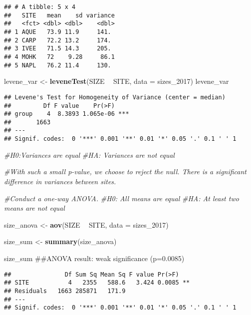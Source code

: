 \documentclass[]{article}
\newenvironment{Shaded}{\begin{snugshade}}{\end{snugshade}}
\newcommand{\KeywordTok}[1]{\textcolor[rgb]{0.13,0.29,0.53}{\textbf{#1}}}
\newcommand{\DataTypeTok}[1]{\textcolor[rgb]{0.13,0.29,0.53}{#1}}
\newcommand{\DecValTok}[1]{\textcolor[rgb]{0.00,0.00,0.81}{#1}}
\newcommand{\StringTok}[1]{\textcolor[rgb]{0.31,0.60,0.02}{#1}}
\newcommand{\CommentTok}[1]{\textcolor[rgb]{0.56,0.35,0.01}{\textit{#1}}}
\newcommand{\OperatorTok}[1]{\textcolor[rgb]{0.81,0.36,0.00}{\textbf{#1}}}
\newcommand{\NormalTok}[1]{#1}
\begin{document}
\begin{verbatim}
## # A tibble: 5 x 4
##   SITE   mean    sd variance
##   <fct> <dbl> <dbl>    <dbl>
## 1 AQUE   73.9 11.9     141. 
## 2 CARP   72.2 13.2     174. 
## 3 IVEE   71.5 14.3     205. 
## 4 MOHK   72    9.28     86.1
## 5 NAPL   76.2 11.4     130.
\end{verbatim}

\begin{Shaded}
\begin{Highlighting}[]
\NormalTok{levene_var <-}\StringTok{ }\KeywordTok{leveneTest}\NormalTok{(SIZE }\OperatorTok{~}\StringTok{ }\NormalTok{SITE, }\DataTypeTok{data =}\NormalTok{ sizes_}\DecValTok{2017}\NormalTok{)}
\NormalTok{levene_var}
\end{Highlighting}
\end{Shaded}

\begin{verbatim}
## Levene's Test for Homogeneity of Variance (center = median)
##         Df F value    Pr(>F)    
## group    4  8.3893 1.065e-06 ***
##       1663                      
## ---
## Signif. codes:  0 '***' 0.001 '**' 0.01 '*' 0.05 '.' 0.1 ' ' 1
\end{verbatim}

\begin{Shaded}
\begin{Highlighting}[]
\CommentTok{#H0:Variances are equal}
\CommentTok{#HA: Variances are not equal}

\CommentTok{#With such a small p-value, we choose to reject the null. There is a significant difference in variances between sites.}


\CommentTok{#Conduct a one-way ANOVA.}
\CommentTok{#H0: All means are equal}
\CommentTok{#HA: At least two means are not equal}

\NormalTok{size_anova <-}\StringTok{ }\KeywordTok{aov}\NormalTok{(SIZE }\OperatorTok{~}\StringTok{ }\NormalTok{SITE, }\DataTypeTok{data =}\NormalTok{ sizes_}\DecValTok{2017}\NormalTok{)}

\NormalTok{size_sum <-}\StringTok{ }\KeywordTok{summary}\NormalTok{(size_anova)}

\NormalTok{size_sum ##ANOVA result: weak significance (p=0.0085)}
\end{Highlighting}
\end{Shaded}

\begin{verbatim}
##               Df Sum Sq Mean Sq F value Pr(>F)   
## SITE           4   2355   588.6   3.424 0.0085 **
## Residuals   1663 285871   171.9                  
## ---
## Signif. codes:  0 '***' 0.001 '**' 0.01 '*' 0.05 '.' 0.1 ' ' 1
\end{verbatim}
\end{document}
